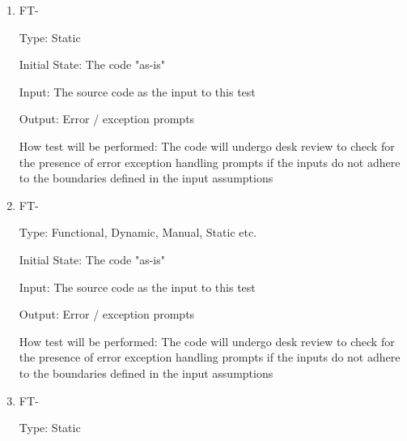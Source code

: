 \documentclass[12pt, titlepage]{article}
\newcounter{ftnum} %
\begin{document}
\begin{enumerate}

\item{FT-\theftnum \label{ft-inputdesk}}

Type: Static %
					
Initial State: The code "as-is"
					
Input: The source code as the input to this test
					
Output: Error / exception prompts 
					
How test will be performed: The code will undergo desk review to check for the presence of error exception handling prompts if the inputs do not adhere to the boundaries defined in the input assumptions

\item{FT-\theftnum \label{ft-in}}

Type:  Functional, Dynamic, Manual, Static etc.
					
Initial State: The code "as-is"
					
Input: The source code as the input to this test
					
Output: Error / exception prompts
					
How test will be performed: The code will undergo desk review to check for the presence of error exception handling prompts if the inputs do not adhere to the boundaries defined in the input assumptions

\item{FT-\theftnum \label{ft-walkthrough}}

Type: Static %
					
%					
%					
%					
%
%
%					
%					
%					
%					
					

\end{enumerate}
\end{document}
